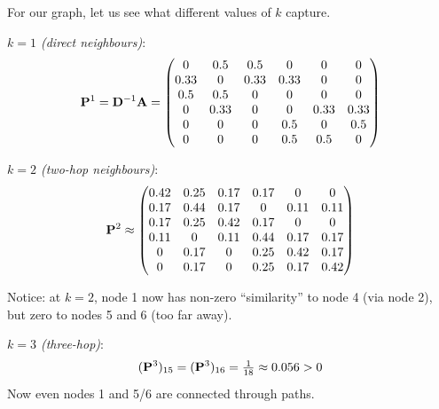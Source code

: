 \begin{notechapter}
\begin{example}
For our graph, let us see what different values of $k$ capture.

\emph{$k=1$ (direct neighbours)}:
\[
\mathbf{P}^1 = \mathbf{D}^{-1}\mathbf{A} = \begin{pmatrix}
0 & 0.5 & 0.5 & 0 & 0 & 0 \\
0.33 & 0 & 0.33 & 0.33 & 0 & 0 \\
0.5 & 0.5 & 0 & 0 & 0 & 0 \\
0 & 0.33 & 0 & 0 & 0.33 & 0.33 \\
0 & 0 & 0 & 0.5 & 0 & 0.5 \\
0 & 0 & 0 & 0.5 & 0.5 & 0
\end{pmatrix}
\]

\emph{$k=2$ (two-hop neighbours)}:
\[
\mathbf{P}^2 \approx \begin{pmatrix}
0.42 & 0.25 & 0.17 & 0.17 & 0 & 0 \\
0.17 & 0.44 & 0.17 & 0 & 0.11 & 0.11 \\
0.17 & 0.25 & 0.42 & 0.17 & 0 & 0 \\
0.11 & 0 & 0.11 & 0.44 & 0.17 & 0.17 \\
0 & 0.17 & 0 & 0.25 & 0.42 & 0.17 \\
0 & 0.17 & 0 & 0.25 & 0.17 & 0.42
\end{pmatrix}
\]

Notice: at $k=2$, node 1 now has non-zero ``similarity'' to node 4 (via node 2), but zero to nodes 5 and 6 (too far away).

\emph{$k=3$ (three-hop)}:
\[
(\mathbf{P}^3)_{15} = (\mathbf{P}^3)_{16} = \tfrac1{18} \approx 0.056 > 0
\]
Now even nodes 1 and 5/6 are connected through paths.

\begin{center}
\end{center}
\end{example}


\end{notechapter}
